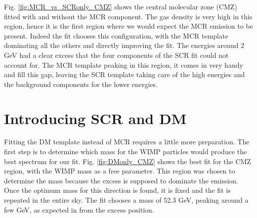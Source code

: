 Fig. \ref{fig:MCR_vs_SCRonly_CMZ} shows the central molecular zone (CMZ) fitted with and without the MCR component. The gas density is very high in this region, hence it is the first region where we would expect the MCR emission to be present. 
Indeed the fit chooses this configuration, with the MCR template dominating all the others and directly improving the fit. The energies around 2 GeV had a clear excess that the four components of the SCR fit could not account for. The MCR template peaking in this region, it comes in very handy and fill this gap, leaving the SCR template taking care of the high energies and the background components for the lower energies.



\section{Introducing SCR and DM}
%

%
%

Fitting the DM template instead of MCR requires a little more preparation. The first step is to determine which mass for the WIMP particles would produce the best spectrum for our fit. Fig. \ref{fig:DMonly_CMZ} shows the best fit for the CMZ region, with the WIMP mass as a free parameter. This region was chosen to determine the mass because the excess is supposed to dominate the emission. Once the optimum mass for this direction is found, it is fixed and the fit is repeated in the entire sky.
The fit chooses a mass of 52.3 GeV, peaking around a few GeV, as expected in from the excess position.


